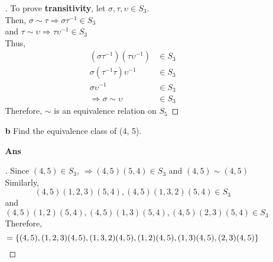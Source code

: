 \documentclass[paper=usletter, fontsize=12pt]{article}
\begin{document}
\begin{itemize}
\begin{itemize}
\begin{itemize}
\begin{proof}[\unskip\nopunct]
                    To prove \textbf{transitivity}, let $\sigma, \tau, \upsilon
                    \in S_3$.\\
                    Then, $\sigma \sim \tau \Rightarrow \sigma\tau^{-1} \in
                    S_3$\\
                    and $\tau \sim \upsilon \Rightarrow \tau\upsilon^{-1} \in
                    S_3$\\
                    Thus,
                    \begin{align*}
                        (\sigma\tau^{-1})(\tau\upsilon^{-1}) & \in S_3\\
                        \sigma(\tau^{-1}\tau)\upsilon^{-1} & \in S_3\\
                        \sigma\upsilon^{-1} & \in S_3\\
                        \Rightarrow \sigma \sim \upsilon & \in S_3
                    \end{align*}
                    Therefore, $\sim$ is an equivalence relation on $S_5$
                    \qedhere
                \end{proof}
                \vspace{0.2in}

                \item[\textbf{b}] Find the equivalence class of (4, 5).
                \item[\textbf{Ans}]
                \begin{proof}[\unskip\nopunct]
                    Since $(4,5) \in S_3$, $\Rightarrow (4,5)(5,4) \in S_3$ and
                    $(4,5) \sim (4,5)$\\
                    Similarly,\\
                    \begin{equation*}
                        (4,5)(1,2,3)(5,4), (4,5)(1,3,2)(5,4) \in S_3
                    \end{equation*}
                    and
                    \begin{equation*}
                        (4,5)(1,2)(5,4), (4,5)(1,3)(5,4), (4,5)(2,3)(5,4) \in S_3
                    \end{equation*}
                    Therefore,
                    \begin{equation*}
                        [(4,5)] = \{(4,5), (1,2,3)(4,5), (1,3,2)(4,5), (1,2)(4,5), (1,3)(4,5), (2,3)(4,5)\} \qedhere
                    \end{equation*}
                \end{proof}
                \vspace{0.2in}


\end{itemize}
\end{itemize}
\end{itemize}
\end{document}
